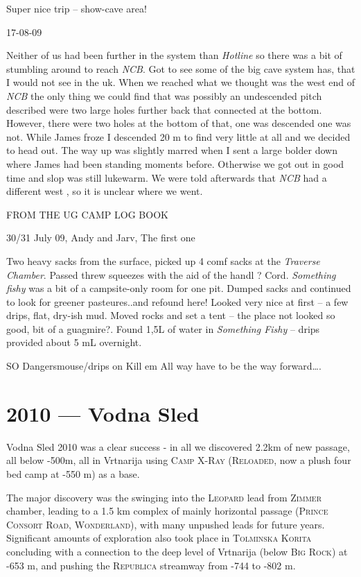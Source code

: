 Super nice trip -- show-cave area!

17-08-09

Neither of us had been further in the system than \emph{Hotline} so
there was a bit of stumbling around to reach \emph{NCB}. Got to see some
of the big cave system has, that I would not see in the uk. When we
reached what we thought was the west end of \emph{NCB} the only thing we
could find that was possibly an undescended pitch described were two
large holes further back that connected at the bottom. However, there
were two holes at the bottom of that, one was descended one was not.
While James froze I descended 20 m to find very little at all and we
decided to head out. The way up was slightly marred when I sent a large
bolder down where James had been standing moments before. Otherwise we
got out in good time and slop was still lukewarm. We were told
afterwards that \emph{NCB} had a different west , so it is unclear where
we went.

FROM THE UG CAMP LOG BOOK

30/31 July 09, Andy and Jarv, The first one

Two heavy sacks from the surface, picked up 4 comf sacks at the
\emph{Traverse Chamber}. Passed threw squeezes with the aid of the handl
? Cord. \emph{Something fishy} was a bit of a campsite-only room for one
pit. Dumped sacks and continued to look for greener pasteures..and
refound here! Looked very nice at first -- a few drips, flat, dry-ish
mud. Moved rocks and set a tent -- the place not looked so good, bit of
a guagmire?. Found 1,5L of water in \emph{Something Fishy} -- drips
provided about 5 mL overnight.

SO Dangersmouse/drips on Kill em All way have to be the way
forward\ldots{}.

\hypertarget{vodna-sled}{%
\chapter{2010 --- Vodna Sled}\label{vodna-sled}}

Vodna Sled 2010 was a clear success - in all we discovered 2.2km of new
passage, all below -500m, all in Vrtnarija using \textsc{Camp
X-Ray} (\textsc{Reloaded}, now a plush four bed camp at -550 m) as a
base.

The major discovery was the swinging into the \textsc{Leopard} lead from
\textsc{Zimmer} chamber, leading to a 1.5 km complex of mainly
horizontal passage (\textsc{Prince Consort Road}, \textsc{Wonderland}),
with many unpushed leads for future years. Significant amounts of
exploration also took place in \textsc{Tolminska Korita} concluding with
a connection to the deep level of Vrtnarija (below \textsc{Big Rock}) at
-653 m, and pushing the \textsc{Republica} streamway from -744 to -802
m.

